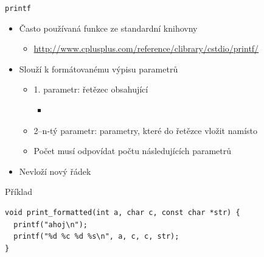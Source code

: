 \begin{frame}[fragile]{\texttt{printf}}

  \begin{itemize}
    \item Často používaná funkce ze standardní knihovny
    \begin{itemize}
      \item \footnotesize\url{http://www.cplusplus.com/reference/clibrary/cstdio/printf/}
    \end{itemize}

    \pause

    \item Slouží k formátovanému výpisu parametrů
    \begin{itemize}
      \item 1. parametr: řetězec obsahující 
      \begin{itemize}
	\item {}
      \end{itemize}

      \pause

      \item 2--n-tý parametr: parametry, které do řetězce vložit namísto
      \item Počet  musí odpovídat počtu následujících parametrů
    \end{itemize}

    \pause

    \item Nevloží nový řádek
  \end{itemize}


  \begin{block}{Příklad}
    \begin{lstlisting}
void print_formatted(int a, char c, const char *str) {
  printf("ahoj\n");
  printf("%d %c %d %s\n", a, c, c, str);
}
    \end{lstlisting}
  \end{block}

\end{frame}


